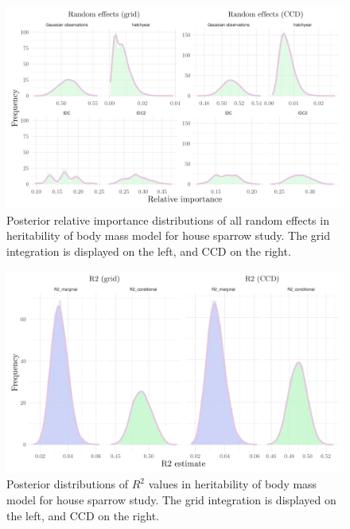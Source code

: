 \begin{figure}[H]%
  \centering
  \includegraphics[width=1\linewidth]{Figures/House sparrow study/Mass_random.png}
  \caption[Posterior relative importance distributions of all random effects in body mass model for house sparrow study]{Posterior relative importance distributions of all random effects in heritability of body mass model for house sparrow study. The grid integration is displayed on the left, and CCD on the right.}
  \label{fig:mass_random_sparrows}
\end{figure}

\begin{figure}[H]%
  \centering
  \includegraphics[width=1\linewidth]{Figures/House sparrow study/Mass_r2.png}
  \caption[Posterior distributions of $R^2$ values in body mass model for house sparrow study]{Posterior distributions of $R^2$ values in heritability of body mass model for house sparrow study. The grid integration is displayed on the left, and CCD on the right.}
  \label{fig:mass_r2}
\end{figure}

